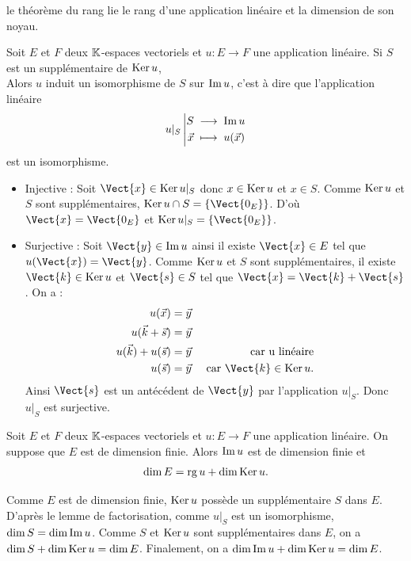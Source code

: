 \documentclass{book}
\begin{document}
\begin{Texte}
 le théorème du rang lie le rang d'une application linéaire et la dimension de son noyau.
\end{Texte}
\begin{Lemme}[Factorisation]
Soit $E$ et $F$ deux $\mathbb{K} $-espaces vectoriels  et $u:E\to F$ une application linéaire.
Si $S$ est un supplémentaire de $\operatorname{Ker} u$, \\
Alors $u$ induit un isomorphisme de $S$ sur $\operatorname{Im} u$,
c'est à dire que l'application linéaire
\[ {u\vert_S}\left|\begin{aligned}{S}&\;\longrightarrow\;{\operatorname{Im} u}\\{\vec{x}}&\;\longmapsto\;{u(\vec{x})}\end{aligned}\right. \]
est un isomorphisme.
\end{Lemme}
\begin{Demonstration}
\begin{itemize}
\item Injective :  Soit $\Vect{x}\in\Ker u\vert_S$ donc $x\in\operatorname{Ker} u$ et  $x\in S$. Comme $\operatorname{Ker} u$ et  $S$ sont supplémentaires, $\Ker u \cap S =\{\Vect{0_E}\}$. D'où $\Vect{x}=\Vect{0_E}$ et $\Ker u\vert_S=\{\Vect{0_E}\}$. 
\item Surjective : Soit $\Vect{y}\in \im u$ ainsi il existe $\Vect{x}\in E$ tel que $u(\Vect{x})=\Vect{y}$.  Comme  $\operatorname{Ker} u$ et  $S$ sont supplémentaires, il existe $\Vect{k}\in\Ker u$  et $\Vect{s}\in S $ tel que $\Vect{x}=\Vect{k}+\Vect{s}$. On  a :
$$
\begin{aligned}
u(\vec{x})&=\vec{y}&\\
u(\vec{k}+\vec{s})&=\vec{y}&\\
u(\vec{k})+u(\vec{s})&=\vec{y}&\text{ car u  linéaire}\\
 u(\vec{s})&=\vec{y}&\text{ car } \Vect{k}\in\Ker u.\\
\end{aligned}
$$
Ainsi $\Vect{s}$ est un antécédent de $\Vect{y}$ par l'application $u\vert_S$. Donc $u\vert_S$ est surjective.
\end{itemize}
\end{Demonstration}

\begin{Theoreme}

Soit $E$ et $F$ deux $\mathbb{K} $-espaces vectoriels  et $u:E\to F$ une application linéaire.
On suppose que $E$ est de dimension finie.
Alors $\operatorname{Im} u$ est de dimension finie et
\[ \dim E = \operatorname{rg} u + \dim \operatorname{Ker} u. \]
\end{Theoreme}

\begin{Demonstration}
Comme $E$ est de dimension finie, $\operatorname{Ker} u$ possède un supplémentaire $S$ dans $E$. D'après le lemme de factorisation, comme $u\vert_S$ 
est un isomorphisme,   $\dim S = \dim \operatorname{Im} u$. Comme  $S$ et $\operatorname{Ker} u$ sont supplémentaires dans $E$, on a $\dim S+\dim \operatorname{Ker} u=\dim E$. Finalement, on a 
$\dim \operatorname{Im} u+\dim \operatorname{Ker} u=\dim E$.
\end{Demonstration}
\end{document}
